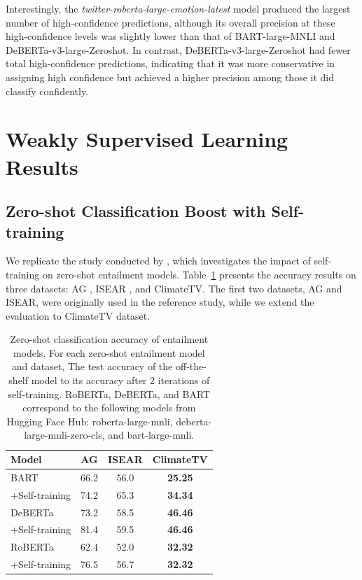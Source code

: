 Interestingly, the \emph{twitter-roberta-large-emotion-latest} model produced the largest number of high-confidence predictions, although its overall precision at these high-confidence levels was slightly lower than that of BART-large-MNLI and DeBERTa-v3-large-Zeroshot. In contrast, DeBERTa-v3-large-Zeroshot had fewer total high-confidence predictions, indicating that it was more conservative in assigning high confidence but achieved a higher precision among those it did classify confidently.



\section{Weakly Supervised Learning Results}
\subsection{Zero-shot Classification Boost with Self-training}

We replicate the study conducted by \cite{gera_zero-shot_2022}, which investigates the impact of self-training on zero-shot entailment models. Table~\ref{tab:zero_shot} presents the accuracy results on three datasets: AG \cite{DBLP:journals/corr/ZhangZL15}, ISEAR \cite{Shao2015UniversalityVC}, and ClimateTV. The first two datasets, AG and ISEAR, were originally used in the reference study, while we extend the evaluation to ClimateTV dataset.

\begin{table}[ht]
    \centering
    \begin{tabular}{lccc}
        \toprule
        Model & AG  & ISEAR & ClimateTV \\
        \midrule
        BART & 66.2 & 56.0 & \textbf{25.25} \\
        +Self-training & 74.2 & 65.3 & \textbf{34.34} \\
        \midrule
        DeBERTa & 73.2 & 58.5 & \textbf{46.46} \\
        +Self-training & 81.4 & 59.5 & \textbf{46.46} \\
        \midrule
        RoBERTa & 62.4 & 52.0 & \textbf{32.32} \\
        +Self-training & 76.5 & 56.7 & \textbf{32.32} \\
        \bottomrule
    \end{tabular}
    \caption{Zero-shot classification accuracy of entailment models. For each zero-shot entailment model and dataset, The test accuracy of the off-the-shelf model to its accuracy after 2 iterations of self-training. RoBERTa, DeBERTa, and BART correspond to the following models from Hugging Face Hub: roberta-large-mnli, deberta-large-mnli-zero-cls, and bart-large-mnli.}
    \label{tab:zero_shot}
\end{table}

